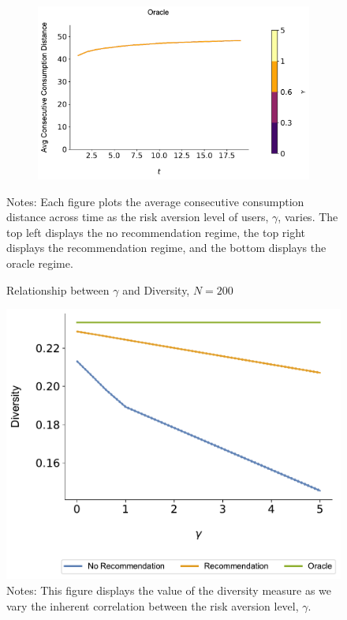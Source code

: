 \documentclass[format=acmsmall, review=true]{acmart}
\begin{document}
\begin{figure}[H]
\begin{subfigure}{.45\textwidth}
\end{subfigure}\\
\begin{subfigure}{.45\textwidth}
\includegraphics[width=\linewidth]{figures/gamma_consumption_dist_N_200T_20_omni.pdf}\\
\end{subfigure}%
\caption*{\scriptsize Notes: Each figure plots the average consecutive consumption distance across time as the risk aversion level of users, $\gamma$, varies. The top left displays the no recommendation regime, the top right displays the recommendation regime, and the bottom displays the oracle regime.}
\label{fig:no_rec_risk_aversion}
\end{figure}
\addtocounter{figure}{-1}

\begin{figure}[ht]
\caption{Relationship between $\gamma$ and Diversity, $N = 200$}
\includegraphics[width=.45\linewidth]{figures/gamma_diversity_N_200_T_20}
\caption*{\scriptsize Notes: This figure displays the value of the diversity measure as we vary the inherent correlation between the risk aversion level, $\gamma$.}\label{fig:cor_homo}
\end{figure}
\end{document}
